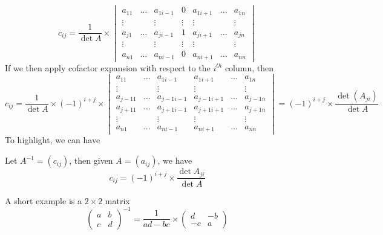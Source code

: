 $$c_{ij} = \frac{1}{\det A} \times \begin{vmatrix}
    a_{11} & \dots & a_{1i-1} & 0 & a_{1i+1} & \dots & a_{1n} \\
    \vdots & & \vdots & \vdots & \vdots & & \vdots \\
    a_{j1} & \dots & a_{ji-1} & 1 & a_{ji+1} & \dots & a_{jn} \\
    \vdots & & \vdots & \vdots & \vdots & & \vdots \\
    a_{n1} & \dots & a_{ni-1} & 0 & a_{ni+1} & \dots & a_{nn}
\end{vmatrix}$$
If we then apply cofactor expansion with respect to the $i^{th}$ column, then
$$c_{ij} = \frac{1}{\det A} \times (-1)^{i+j} \times \begin{vmatrix}
    a_{11} & \dots & a_{1i-1} & a_{1i+1} & \dots & a_{1n} \\
    \vdots &       & \vdots   & \vdots   &       & \vdots \\
    a_{j-11} & \dots & a_{j-1i-1} & a_{j-1i+1} & \dots & a_{j-1n} \\
    a_{j+11} & \dots & a_{j+1i-1} & a_{j+1i+1} & \dots & a_{j+1n} \\
    \vdots &       & \vdots   & \vdots   &       & \vdots \\
    a_{n1} & \dots & a_{ni-1} & a_{ni+1} & \dots & a_{nn}
\end{vmatrix} =  (-1)^{i+j} \times \frac{\det(A_{ji})}{\det A}$$
To highlight, we can have
\begin{proposition}
    Let $A^{-1} = (c_{ij})$, then given $A = (a_{ij})$, we have
    $$c_{ij} = (-1)^{i+j} \times \frac{\det A_{ji}}{\det A}$$
\end{proposition}
A short example is a $2 \times 2$ matrix
$$\begin{pmatrix}
    a & b \\
    c & d
\end{pmatrix}^{-1} = \frac{1}{ad-bc} \times \begin{pmatrix}
    d & -b \\
    -c & a
\end{pmatrix}$$
\newpage